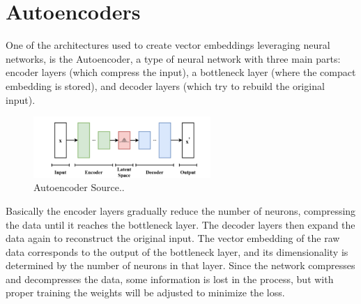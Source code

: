 \section{Autoencoders}
One of the architectures used to create vector embeddings leveraging neural networks, is the Autoencoder, a type of neural network with three main parts: encoder layers (which compress the input), a bottleneck layer (where the compact embedding is stored), and decoder layers (which try to rebuild the original input). 
\begin{figure}[h]
    \centering
    \includegraphics[width=0.6\textwidth]{IMAGES/immagine_2025-02-26_154609390.png}
    \caption{Autoencoder Source.\footnotemark.}
    \label{fig:Autoencoder}
\end{figure}
Basically the encoder layers gradually reduce the number of neurons, compressing the data until it reaches the bottleneck layer. The decoder layers then expand the data again to reconstruct the original input. The vector embedding of the raw data corresponds to the output of the bottleneck layer, and its dimensionality is determined by the number of neurons in that layer. Since the network compresses and decompresses the data, some information is lost in the process, but with proper training the weights will be adjusted to minimize the loss. 
